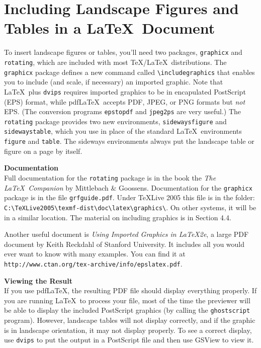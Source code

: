 \documentclass[11pt]{article}
\begin{document}
\section*{Including Landscape Figures and Tables in a \LaTeX\ Document}
To insert landscape figures or tables, you'll need two packages, 
\texttt{graphicx} and \texttt{rotating}, which are included with most 
\TeX/\LaTeX\ distributions.  
The \texttt{graphicx} package defines a new command called 
\verb+\includegraphics+ that enables you to include (and scale, 
if necessary) an imported graphic. 
Note that \LaTeX\ plus \texttt{dvips} requires imported graphics to be in 
encapulated PostScript (EPS) format, while pdf\LaTeX\ accepts PDF, JPEG, 
or PNG formats but \textit{not} EPS. (The conversion programs 
\texttt{epstopdf} and \texttt{jpeg2ps} are very useful.)
The \texttt{rotating} package provides two new environments,
\texttt{sidewaysfigure} and \texttt{sidewaystable}, which you use in
place of the standard \LaTeX\ environments \texttt{figure} and 
\texttt{table}. The sideways environments always put the landscape 
table or figure on a page by itself. 

\textbf{\large Documentation}\\[2pt]
Full documentation for the \texttt{rotating} package is in the book 
the \textit{The \LaTeX\ Companion} by Mittlebach \& Goossens. 
Documentation for the \texttt{graphicx} package is in the file
\texttt{grfguide.pdf}. Under TeXLive 2005 this file is 
in the folder: 
    \verb+C:\TeXLive2005\texmf-dist\doc\latex\graphics\+.
On other systems, it will be in a similar location. 
The material on including graphics is in Section 4.4.
 
Another useful document is \textit{Using Imported Graphics in \LaTeX2e}, 
a large PDF document by Keith Reckdahl of Stanford University. 
It includes all you would ever want to know with many examples. 
You can find it at 
\verb+http://www.ctan.org/tex-archive/info/epslatex.pdf+.

\textbf{\large Viewing the Result}\\[2pt] 
If you use pdf\LaTeX, the resulting PDF file should 
display everything properly.
If you are running \LaTeX\ to process your file, most of the time the 
previewer will be able to display the included PostScript
graphics (by calling the \verb+ghostscript+ program).  
However, landscape tables will not display correctly, and if the
graphic is in landscape orientation, it may not display properly.
To see a correct display, use \verb+dvips+ to put the output in a 
PostScript file and then use GSView to view it.  
\end{document}
